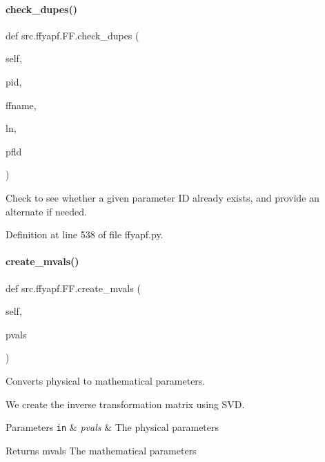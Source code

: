 \mbox{\label{classsrc_1_1ffyapf_1_1FF_ab59231fa39e29bfdc70466871c4ec8be}} 
\paragraph{\texorpdfstring{check\+\_\+dupes()}{check\_dupes()}}
{\footnotesize\ttfamily def src.\+ffyapf.\+F\+F.\+check\+\_\+dupes (\begin{DoxyParamCaption}\item[{}]{self,  }\item[{}]{pid,  }\item[{}]{ffname,  }\item[{}]{ln,  }\item[{}]{pfld }\end{DoxyParamCaption})}



Check to see whether a given parameter ID already exists, and provide an alternate if needed. 



Definition at line 538 of file ffyapf.\+py.

\mbox{\label{classsrc_1_1ffyapf_1_1FF_aa4b5af969fa68f6836150b934cb34a3a}} 
\paragraph{\texorpdfstring{create\+\_\+mvals()}{create\_mvals()}}
{\footnotesize\ttfamily def src.\+ffyapf.\+F\+F.\+create\+\_\+mvals (\begin{DoxyParamCaption}\item[{}]{self,  }\item[{}]{pvals }\end{DoxyParamCaption})}



Converts physical to mathematical parameters. 

We create the inverse transformation matrix using S\+VD.


\begin{DoxyParams}[1]{Parameters}
\mbox{\tt in}  & {\em pvals} & The physical parameters \\
\hline
\end{DoxyParams}
\begin{DoxyReturn}{Returns}
mvals The mathematical parameters 
\end{DoxyReturn}


